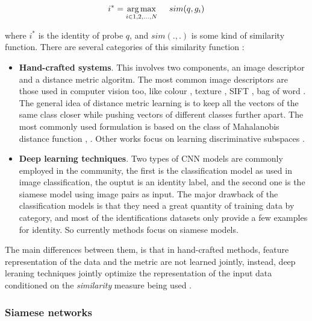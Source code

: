 \documentclass[12pt, a4paper, titlepage,twoside,openright]{article}
\begin{document}

$$ i^{*} = \underset{i \in 1,2,...,N}{\arg\max} \hspace{0.5cm} sim(q,g_{i}) $$

where $i^{*}$ is the identity of probe $q$, and $sim( . , . )$ is some kind of similarity function. There are several categories of this similarity function \cite{pastPresent}:

\begin{itemize}
 
\item \textbf{Hand-crafted systems}. This involves two components, an image descriptor and a distance metric algoritm. The most common image descriptors are those used in computer vision too, like colour \cite{lbp}, texture \cite{pairwise}, SIFT \cite{sift}, bag of word \cite{bagword}. The general idea of distance metric learning is to keep all the vectors of the same class closer while pushing vectors of different classes further apart. The most commonly used formulation is based on the class of Mahalanobis distance function \cite{kiisme}, \cite{lnnn}. Other works focus on learning discriminative subspaces \cite{lda}.

\item \textbf{Deep learning techniques}. Two types of CNN models are commonly employed in the community, the first is the classification model as used in image classification, the ouptut is an identity label, and the second one is the siamese model using image pairs as input. The major drawback of the classification models is that they need a great quantity of training data by category, and most of the identifications datasets only provide a few examples for identity. So currently methods focus on siamese models.

\end{itemize} 

The main differences between them, is that in hand-crafted methods, feature representation of the data and the metric are not learned jointly, instead, deep leraning techniques jointly optimize the representation of the input data conditioned on the \textit{similarity} measure being used \cite{EC1}. 





\subsubsection{Siamese networks}
\end{document}
